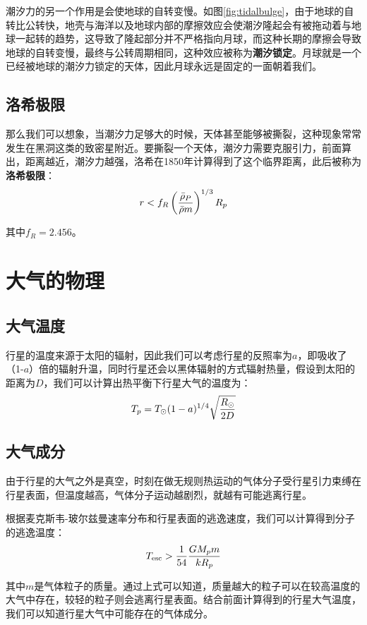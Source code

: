 潮汐力的另一个作用是会使地球的自转变慢。如图\ref{fig:tidalbulge}，由于地球的自转比公转快，地壳与海洋以及地球内部的摩擦效应会使潮汐隆起会有被拖动着与地球一起转的趋势，这导致了隆起部分并不严格指向月球，而这种长期的摩擦会导致地球的自转变慢，最终与公转周期相同，这种效应被称为\textbf{潮汐锁定}。月球就是一个已经被地球的潮汐力锁定的天体，因此月球永远是固定的一面朝着我们。

\subsection{洛希极限}
那么我们可以想象，当潮汐力足够大的时候，天体甚至能够被撕裂，这种现象常常发生在黑洞这类的致密星附近。要撕裂一个天体，潮汐力需要克服引力，前面算出，距离越近，潮汐力越强，洛希在1850年计算得到了这个临界距离，此后被称为\textbf{洛希极限}：
\begin{equation}
  r<f_R\left(\bar \rho_P \over \bar \rho m\right)^{1/3}R_p
\end{equation}

其中$f_R=2.456$。

\section{大气的物理}
\subsection{大气温度}
行星的温度来源于太阳的辐射，因此我们可以考虑行星的反照率为$a$，即吸收了（1-$a$）倍的辐射升温，同时行星还会以黑体辐射的方式辐射热量，假设到太阳的距离为$D$，我们可以计算出热平衡下行星大气的温度为：
\begin{equation}
  T_p=T_\odot(1-a)^{1/4}\sqrt{R_\odot \over 2D}
\end{equation}

\subsection{大气成分}
由于行星的大气之外是真空，时刻在做无规则热运动的气体分子受行星引力束缚在行星表面，但温度越高，气体分子运动越剧烈，就越有可能逃离行星。

根据麦克斯韦-玻尔兹曼速率分布和行星表面的逃逸速度，我们可以计算得到分子的逃逸温度：
\begin{equation}
  T_\mathrm{esc}>{1\over54}{GM_p m \over kR_p}
\end{equation}

其中$m$是气体粒子的质量。通过上式可以知道，质量越大的粒子可以在较高温度的大气中存在，较轻的粒子则会逃离行星表面。结合前面计算得到的行星大气温度，我们可以知道行星大气中可能存在的气体成分。

